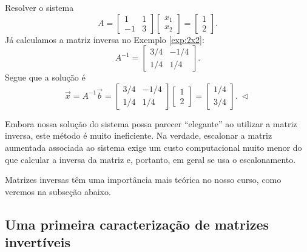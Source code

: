 \begin{ex}
	Resolver o sistema
	\begin{equation}
	A = \left[
	\begin{array}{cc}
	1 & 1  \\
	-1 & 3 
	\end{array}
	\right] \left[
	\begin{array}{c}
	x_1  \\
	x_2 
	\end{array}
	\right] =
	\left[
	\begin{array}{c}
	1  \\
	2 
	\end{array}
	\right].
	\end{equation} Já calculamos a matriz inversa no Exemplo \ref{exp:2x2}:
	\begin{equation}
	A^{-1}  =
	\left[
	\begin{array}{cc}
	3/4 & -1/4  \\
	1/4 & 1/4 
	\end{array}
	\right].
	\end{equation} Segue que a solução é
	\begin{equation}
	\vec{x} = A^{-1} \vec{b} =
	\left[
	\begin{array}{cc}
	3/4 & -1/4  \\
	1/4 & 1/4 
	\end{array}
	\right]\left[
	\begin{array}{c}
	1  \\
	2 
	\end{array}
	\right] =
	\left[
	\begin{array}{c}
	1/4 \\
	3/4 
	\end{array}
	\right]. \ \lhd
	\end{equation}
\end{ex}


Embora nossa solução do sistema possa parecer ``elegante'' ao utilizar a matriz inversa, este método é muito ineficiente. Na verdade, escalonar a matriz aumentada associada ao sistema exige um custo computacional muito menor do que calcular a inversa da matriz e, portanto, em geral se usa o escalonamento.

Matrizes inversas têm uma importância mais teórica no nosso curso, como veremos na subseção abaixo.



\subsection{Uma primeira caracterização de matrizes invertíveis}\label{sec:inversa}


